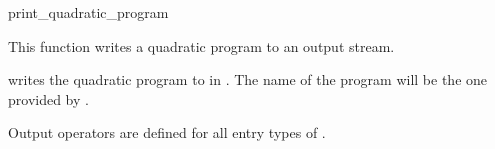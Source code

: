 \begin{ccRefFunction}{print_quadratic_program}


This function writes a quadratic program to an output stream.

{writes the quadratic program  to  in .
The name of the program will be the one provided by .}

Output operators are defined for all entry types of .

\end{ccRefFunction}
